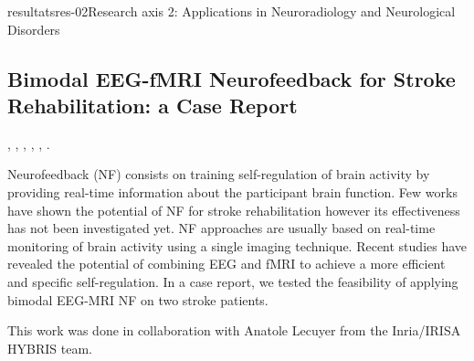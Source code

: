 \documentclass{ra2018}
\begin{document}
\begin{module}{resultats}{res-02}{Research axis 2: Applications in Neuroradiology and Neurological Disorders}

\subsection{Bimodal EEG-fMRI Neurofeedback for Stroke Rehabilitation: a Case Report}
\begin{participants}
      , 
      , 
      ,
      ,
      ,
      .
\end{participants}
Neurofeedback  (NF)  consists  on  training  self-regulation  of  brain  activity  by  providing  real-time information about the participant brain function.  Few works have shown the potential of NF for stroke rehabilitation however its effectiveness has not been investigated yet. NF approaches are usually based on real-time monitoring of brain activity using a single imaging technique.  Recent studies have revealed the potential of combining EEG and fMRI to achieve a more efficient and specific self-regulation. In a case report, we tested the feasibility of applying bimodal EEG-MRI NF on two stroke patients.~\cite{lioi:inserm-01932954}

This work was done in collaboration with Anatole Lecuyer from the Inria/IRISA HYBRIS team.


\end{module}
\end{document}

